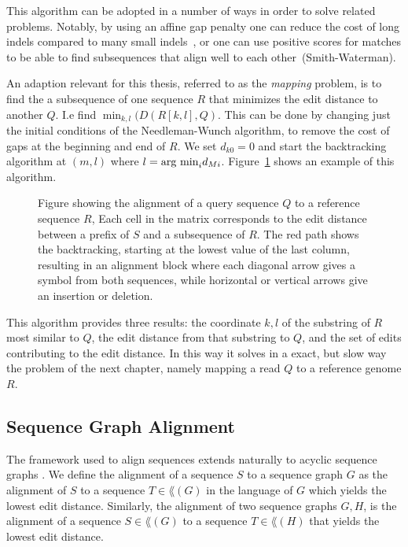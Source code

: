 This algorithm can be adopted in a number of ways in order to solve related problems.
Notably, by using an affine gap penalty one can reduce the cost of long indels compared to many small indels~\cite{affine}, or one can use positive scores for matches to be able to find subsequences that align well to each other~\cite{smithwaterman}(Smith-Waterman).

An adaption relevant for this thesis, referred to as the \emph{mapping} problem, is to find the a subsequence of one sequence $R$ that minimizes the edit distance to another $Q$.
I.e find $\min_{k, l}(D(R[k, l], Q)$.
This can be done by changing just the initial conditions of the Needleman-Wunch algorithm, to remove the cost of gaps at the beginning and end of $R$.
We set $d_{k0} = 0$ and start the backtracking algorithm at $(m, l)$ where $l=\argmin_i d_{Mi}$.
Figure~\ref{fig:needlemanmap} shows an example of this algorithm.
\begin{figure}
  \begin{tikzpicture}
    
  \end{tikzpicture}
  \caption{
    Figure showing the alignment of a query sequence $Q$ to a reference sequence $R$, 
    Each cell in the matrix corresponds to the edit distance between a prefix of $S$ and a subsequence of $R$. The red path shows the backtracking, starting at the lowest value of the last column, resulting in an alignment block where each diagonal arrow gives a symbol from both sequences, while horizontal or vertical arrows give an insertion or deletion.}
  \label{fig:needlemanmap}
\end{figure}
This algorithm provides three results: the coordinate $k, l$ of the substring of $R$ most similar to $Q$, the edit distance from that substring to $Q$, and the set of edits contributing to the edit distance.
In this way it solves in a exact, but slow way the problem of the next chapter, namely mapping a read $Q$ to a reference genome $R$.

\subsection{Sequence Graph Alignment}
The framework used to align sequences extends naturally to acyclic sequence graphs \cite{hein, poa}.
We define the alignment of a sequence $S$ to a sequence graph $G$ as the alignment of $S$ to a sequence $T \in \lang(G)$ in the language of $G$ which yields the lowest edit distance.
Similarly, the alignment of two sequence graphs $G, H$, is the alignment of a sequence $S \in \lang(G)$ to a sequence $T \in \lang(H)$ that yields the lowest edit distance. 

